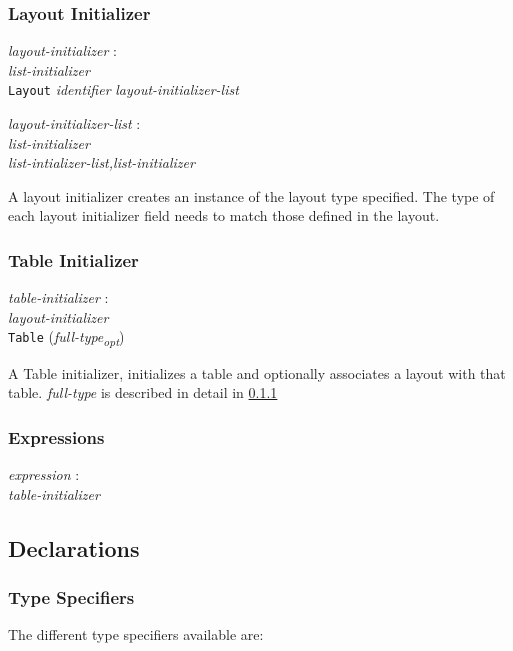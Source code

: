 \documentclass{article}
\begin{document}
\subsubsection{Layout Initializer}
\begin{tabbing}
	\= \emph{lay}\=\emph{out-initializer} : \\
		\>\> \emph{list-initializer} \\
		\>\> \texttt{Layout} \emph{identifier} {\emph{layout-initializer-list}} \\
\end{tabbing}

\begin{tabbing}
	\= \emph{lay}\=\emph{out-initializer-list} : \\ 
		\>\> \emph{list-initializer} \\
		\>\> \emph{list-intializer-list,list-initializer}
\end{tabbing}
A layout initializer creates an instance of the layout type specified. The type of each layout initializer field needs to match those defined in the layout.

\subsubsection{Table Initializer}
\begin{tabbing}
	\= \emph{tab}\=\emph{le-initializer} : \\
		\>\> \emph{layout-initializer} \\
		\>\> \texttt{Table} (\emph{full-type}\textsubscript{\emph{opt}}) \\
\end{tabbing}

A Table initializer, initializes a table and optionally associates a layout with that table. \emph{full-type} is described in detail in \ref{sec:type_decls}

\subsubsection{Expressions}
\begin{tabbing}
	\= \emph{exp}\=\emph{ression} : \\
		\>\> \emph{table-initializer} 
\end{tabbing}
\subsection{Declarations}
\subsubsection{Type Specifiers}
\label{sec:type_decls}
The different type specifiers available are:
\end{document}

